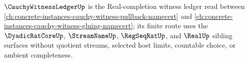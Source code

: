 $\CauchyWitnessLedgerUp$ is the Real-completion witness ledger read between \autoref{ch:concrete-instances-cauchy-witness-pullback-namecert} and \autoref{ch:concrete-instances-cauchy-witness-gluing-namecert}; its finite route uses the $\DyadicRatCoreUp$, $\StreamNameUp$, $\RegSeqRatUp$, and $\RealUp$ sibling surfaces without quotient streams, selected host limits, countable choice, or ambient completeness.









